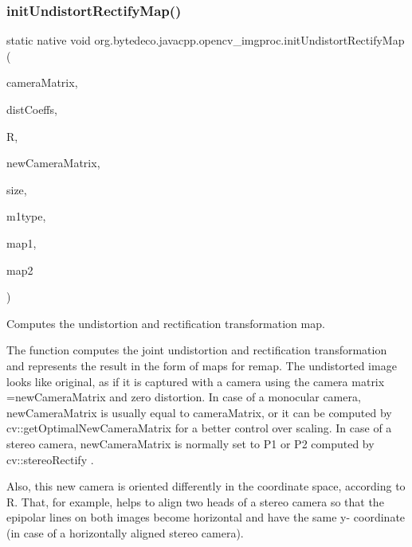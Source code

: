 \subsubsection{\texorpdfstring{init\+Undistort\+Rectify\+Map()}{initUndistortRectifyMap()}}
{\footnotesize\ttfamily static native void org.\+bytedeco.\+javacpp.\+opencv\+\_\+imgproc.\+init\+Undistort\+Rectify\+Map (\begin{DoxyParamCaption}\item[{@By\+Val Mat}]{camera\+Matrix,  }\item[{@By\+Val Mat}]{dist\+Coeffs,  }\item[{@By\+Val Mat}]{R,  }\item[{@By\+Val Mat}]{new\+Camera\+Matrix,  }\item[{@By\+Val Size}]{size,  }\item[{int}]{m1type,  }\item[{@By\+Val Mat}]{map1,  }\item[{@By\+Val Mat}]{map2 }\end{DoxyParamCaption})\hspace{0.3cm}{\ttfamily [static]}}



Computes the undistortion and rectification transformation map. 

The function computes the joint undistortion and rectification transformation and represents the result in the form of maps for remap. The undistorted image looks like original, as if it is captured with a camera using the camera matrix =new\+Camera\+Matrix and zero distortion. In case of a monocular camera, new\+Camera\+Matrix is usually equal to camera\+Matrix, or it can be computed by cv\+::get\+Optimal\+New\+Camera\+Matrix for a better control over scaling. In case of a stereo camera, new\+Camera\+Matrix is normally set to P1 or P2 computed by cv\+::stereo\+Rectify . 

Also, this new camera is oriented differently in the coordinate space, according to R. That, for example, helps to align two heads of a stereo camera so that the epipolar lines on both images become horizontal and have the same y-\/ coordinate (in case of a horizontally aligned stereo camera). 

